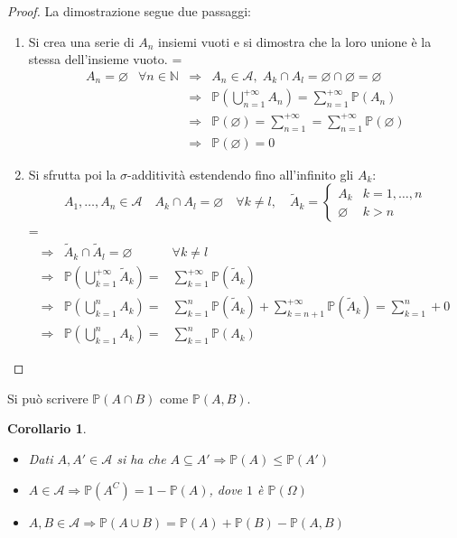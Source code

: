 \documentclass[a4paper,12pt]{article}
\theoremstyle{break}
\newtheorem{corollary}{Corollario}[section]
\let\emptyset\varnothing
\numberwithin{equation}{section}
\begin{document}
\begin{proof}
La dimostrazione segue due passaggi:
  \begin{enumerate}
    \item Si crea una serie di \(A_n\) insiemi vuoti e si dimostra che la loro unione è la stessa dell'insieme vuoto. 
    {\everymath = {\displaystyle}
    \[
      \begin{array}{llll}
        A_n = \emptyset & \forall n \in \mathbb{N} & \Longrightarrow & A_n \in \mathcal{A}, \; A_k \cap A_l = \emptyset \cap \emptyset = \emptyset \\
         & & \Longrightarrow & \mathbb{P}\left(\bigcup_{n=1}^{+\infty} A_n\right) = \sum_{n=1}^{+\infty} \mathbb{P}(A_n) \\
         & & \Longrightarrow & \mathbb{P}(\emptyset) = \sum_{n=1}^{+\infty} = \sum_{n=1}^{+\infty} \mathbb{P}(\emptyset) \\
         & & \Longrightarrow & \mathbb{P}(\emptyset) = 0
      \end{array}
    \]
    }
    \item Si sfrutta poi la \(\sigma\)-additività estendendo fino all'infinito gli \(A_k\):
    \[
      A_1, \ldots, A_n \in \mathcal{A} \quad A_k \cap A_l = \emptyset \quad \forall k \not  = l, \quad \tilde{A}_k = \begin{cases}
        A_k & k = 1, \ldots, n \\
        \emptyset & k > n
      \end{cases} 
    \]
    {\everymath = {\displaystyle}
    \[
      \begin{array}{lll}
        \Longrightarrow & \tilde{A}_k \cap \tilde{A}_l = \emptyset & \forall k \not = l \\
        \Longrightarrow & \mathbb{P}\left(\bigcup_{k=1}^{+\infty} \tilde{A}_k\right) = & \sum_{k=1}^{+\infty} \mathbb{P}(\tilde{A}_k) \\
        \Longrightarrow & \mathbb{P}\left(\bigcup_{k=1}^{n} A_k\right) = & \sum_{k=1}^n \mathbb{P}(\tilde{A}_k) + \sum_{k = n+1}^{+\infty} \mathbb{P}(\tilde{A}_k) = \sum_{k = 1}^{n} + 0 \\
        \Longrightarrow & \mathbb{P}\left(\bigcup_{k=1}^{n} A_k\right) = & \sum_{k=1}^{n} \mathbb{P}(A_k)
      \end{array}
    \]
    }
  \end{enumerate}
\end{proof}
Si può scrivere \(\mathbb{P}(A \cap B)\) come \(\mathbb{P}(A,B)\).
\begin{corollary}
  \begin{itemize}
    \item Dati \(A, A' \in \mathcal{A}\) si ha che \(A \subseteq A' \Longrightarrow \mathbb{P}(A) \leq \mathbb{P} (A')\) 
    \item \(A \in \mathcal{A} \Longrightarrow \mathbb{P}(A^C) = 1 - \mathbb{P}(A)\), dove \(1\) è \(\mathbb{P}(\Omega)\)
    \item \(A, B \in \mathcal{A} \Longrightarrow \mathbb{P}(A \cup B) = \mathbb{P}(A) + \mathbb{P}(B) - \mathbb{P}(A,B)\)
  \end{itemize}
\end{corollary}
\end{document}
